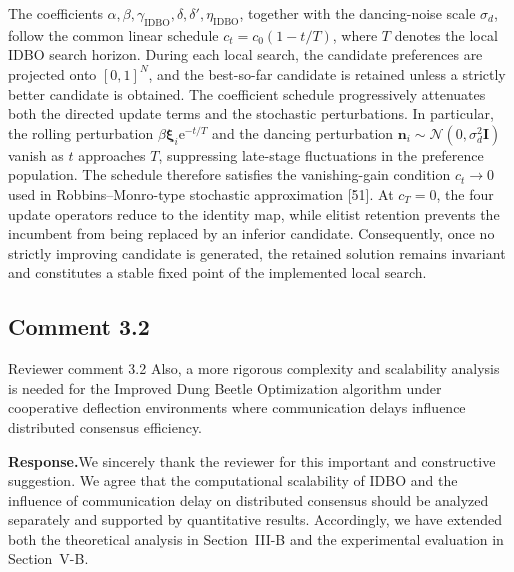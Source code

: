 \documentclass[11pt]{article}
\newcommand{\hladd}[1]{{\color{addblue}#1}}
\newcommand{\rsp}{\medskip\noindent\textbf{Response.}\quad}
\begin{document}
\begin{tcolorbox}[enhanced,breakable,colback=white,colframe=addblue!55,
boxrule=0.6pt,arc=2pt,left=9pt,right=9pt,top=7pt,bottom=7pt]
\hladd{The coefficients
$\alpha,\beta,\gamma_{\mathrm{IDBO}},\delta,\delta',
\eta_{\mathrm{IDBO}}$, together with the dancing-noise scale $\sigma_d$,
follow the common linear schedule $c_t=c_0(1-t/T)$, where $T$ denotes the
local IDBO search horizon. During each local search, the candidate
preferences are projected onto $[0,1]^N$, and the best-so-far candidate is
retained unless a strictly better candidate is obtained. The coefficient
schedule progressively attenuates both the directed update terms and the
stochastic perturbations. In particular, the rolling perturbation
$\beta\boldsymbol{\xi}_i\mathrm{e}^{-t/T}$ and the dancing perturbation
$\mathbf{n}_i\sim\mathcal{N}(0,\sigma_d^2\mathbf{I})$ vanish as $t$
approaches $T$, suppressing late-stage fluctuations in the preference
population. The schedule therefore satisfies the vanishing-gain condition
$c_t\to0$ used in Robbins--Monro-type stochastic approximation
[51]. At $c_T=0$, the four update operators reduce
to the identity map, while elitist retention prevents the incumbent from
being replaced by an inferior candidate. Consequently, once no strictly
improving candidate is generated, the retained solution remains invariant
and constitutes a stable fixed point of the implemented local search.}
\end{tcolorbox}






\subsection*{Comment 3.2}
\begin{reviewercomment}{Reviewer comment 3.2}
Also, a more rigorous complexity and scalability analysis is needed for the
Improved Dung Beetle Optimization algorithm under cooperative deflection
environments where communication delays influence distributed consensus
efficiency.
\end{reviewercomment}

\rsp We sincerely thank the reviewer for this important and constructive
suggestion. We agree that the computational scalability of IDBO and the
influence of communication delay on distributed consensus should be analyzed
separately and supported by quantitative results. Accordingly, we have
extended both the theoretical analysis in Section~III-B and the experimental
evaluation in Section~V-B.
\end{document}
